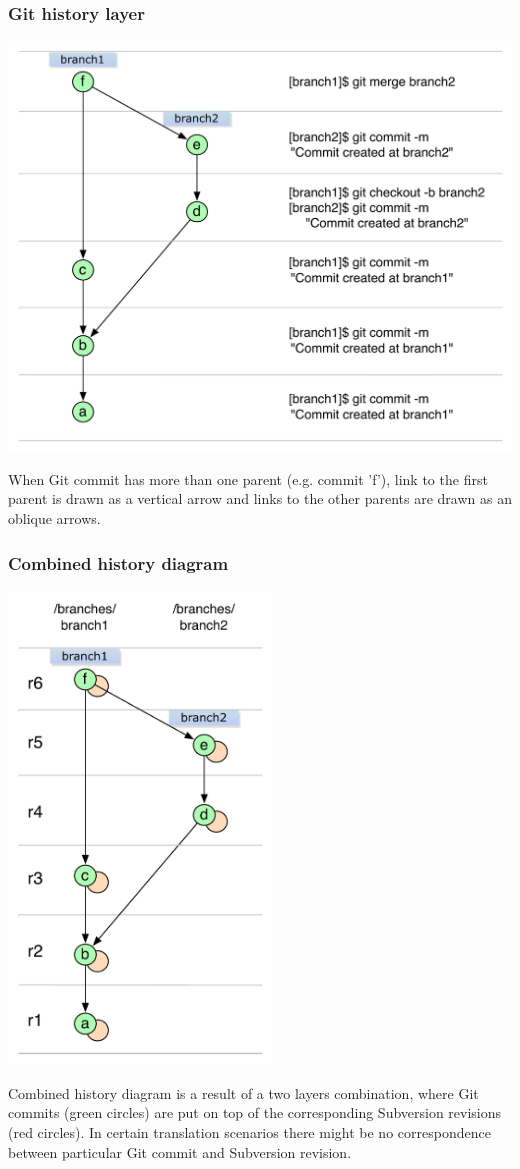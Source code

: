 \subsubsection{Git history layer}
\begin{center}
\includegraphics[width=\textwidth]{img/legend/git_layer.pdf}%
\label{git_layer}%
\end{center}
When Git commit has more than one parent (e.g. commit 'f'), link to the first parent is drawn as a vertical arrow and links to the other 
parents are drawn as an oblique arrows.
\subsubsection{Combined history diagram}
\begin{center}
\includegraphics[width=7.0cm]{img/legend/generalized_history.pdf}%
\label{both_layers}%
\end{center}

Combined history diagram is a result of a two layers combination, where Git commits (green circles) are put on top of the corresponding Subversion revisions (red circles). 
In certain translation scenarios there might be no correspondence between particular Git commit and Subversion revision.